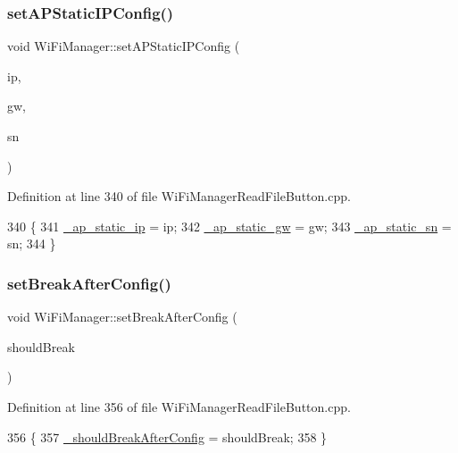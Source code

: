 \subsubsection{\texorpdfstring{set\+A\+P\+Static\+I\+P\+Config()}{setAPStaticIPConfig()}}
{\footnotesize\ttfamily void Wi\+Fi\+Manager\+::set\+A\+P\+Static\+I\+P\+Config (\begin{DoxyParamCaption}\item[{I\+P\+Address}]{ip,  }\item[{I\+P\+Address}]{gw,  }\item[{I\+P\+Address}]{sn }\end{DoxyParamCaption})}



Definition at line 340 of file Wi\+Fi\+Manager\+Read\+File\+Button.\+cpp.


\begin{DoxyCode}
340                                                                               \{
341   \hyperlink{class_wi_fi_manager_ae81b413e85811506099ba6eab48e1006}{\_ap\_static\_ip} = ip;
342   \hyperlink{class_wi_fi_manager_a5ab87bab28f0dc3c865912b4bb303992}{\_ap\_static\_gw} = gw;
343   \hyperlink{class_wi_fi_manager_a8122027aecd1a1dd9b60f21e87286808}{\_ap\_static\_sn} = sn;
344 \}
\end{DoxyCode}
\mbox{\label{class_wi_fi_manager_ad48fd74c893d12778121fa239d245cc9}} 
\subsubsection{\texorpdfstring{set\+Break\+After\+Config()}{setBreakAfterConfig()}}
{\footnotesize\ttfamily void Wi\+Fi\+Manager\+::set\+Break\+After\+Config (\begin{DoxyParamCaption}\item[{boolean}]{should\+Break }\end{DoxyParamCaption})}



Definition at line 356 of file Wi\+Fi\+Manager\+Read\+File\+Button.\+cpp.


\begin{DoxyCode}
356                                                          \{
357   \hyperlink{class_wi_fi_manager_adf42bd3bb7ac538e97407f66e5170858}{\_shouldBreakAfterConfig} = shouldBreak;
358 \}
\end{DoxyCode}
\mbox{\label{class_wi_fi_manager_a904006cb4d2c769e93bfdef336853766}} 

